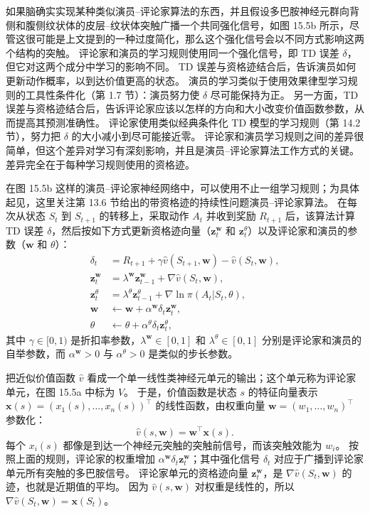 \documentclass[UTF8, 12pt, fontset=fandol, oneside]{ctexart}
\begin{document}
如果脑确实实现某种类似演员--评论家算法的东西，并且假设多巴胺神经元群向背侧和腹侧纹状体的皮层--纹状体突触广播一个共同强化信号，如图 15.5b 所示，尽管这很可能是上文提到的一种过度简化，那么这个强化信号会以不同方式影响这两个结构的突触。
评论家和演员的学习规则使用同一个强化信号，即 TD 误差 $\delta$，但它对这两个成分中学习的影响不同。
TD 误差与资格迹结合后，告诉演员如何更新动作概率，以到达价值更高的状态。
演员的学习类似于使用效果律型学习规则的工具性条件化（第 1.7 节）：演员努力使 $\delta$ 尽可能保持为正。
另一方面，TD 误差与资格迹结合后，告诉评论家应该以怎样的方向和大小改变价值函数参数，从而提高其预测准确性。
评论家使用类似经典条件化 TD 模型的学习规则（第 14.2 节），努力把 $\delta$ 的大小减小到尽可能接近零。
评论家和演员学习规则之间的差异很简单，但这个差异对学习有深刻影响，并且是演员--评论家算法工作方式的关键。
差异完全在于每种学习规则使用的资格迹。

在图 15.5b 这样的演员--评论家神经网络中，可以使用不止一组学习规则；为具体起见，这里关注第 13.6 节给出的带资格迹的持续性问题演员--评论家算法。
在每次从状态 $S_t$ 到 $S_{t+1}$ 的转移上，采取动作 $A_t$ 并收到奖励 $R_{t+1}$ 后，该算法计算 TD 误差 $\delta$，然后按如下方式更新资格迹向量（$\mathbf{z}_t^{\mathbf{w}}$ 和 $\mathbf{z}_t^\theta$）以及评论家和演员的参数（$\mathbf{w}$ 和 $\theta$）：
\[
\begin{aligned}
\delta_t &= R_{t+1}+\gamma \hat v(S_{t+1},\mathbf{w})-\hat v(S_t,\mathbf{w}),\\
\mathbf{z}_t^{\mathbf{w}} &= \lambda^{\mathbf{w}}\mathbf{z}_{t-1}^{\mathbf{w}}+\nabla \hat v(S_t,\mathbf{w}),\\
\mathbf{z}_t^\theta &= \lambda^\theta \mathbf{z}_{t-1}^\theta+\nabla \ln \pi(A_t|S_t,\theta),\\
\mathbf{w} &\leftarrow \mathbf{w}+\alpha^{\mathbf{w}}\delta_t\mathbf{z}_t^{\mathbf{w}},\\
\theta &\leftarrow \theta+\alpha^\theta\delta_t\mathbf{z}_t^\theta,
\end{aligned}
\]
其中 $\gamma\in[0,1)$ 是折扣率参数，$\lambda^{\mathbf{w}}\in[0,1]$ 和 $\lambda^\theta\in[0,1]$ 分别是评论家和演员的自举参数，而 $\alpha^{\mathbf{w}}>0$ 与 $\alpha^\theta>0$ 是类似的步长参数。

把近似价值函数 $\hat v$ 看成一个单一线性类神经元单元的输出；这个单元称为评论家单元，在图 15.5a 中标为 $V$。
于是，价值函数是状态 $s$ 的特征向量表示 $\mathbf{x}(s)=(x_1(s),\ldots,x_n(s))^\top$ 的线性函数，由权重向量 $\mathbf{w}=(w_1,\ldots,w_n)^\top$ 参数化：
\begin{equation}
\hat v(s,\mathbf{w})=\mathbf{w}^\top\mathbf{x}(s).
\tag{15.1}
\end{equation}
每个 $x_i(s)$ 都像是到达一个神经元突触的突触前信号，而该突触效能为 $w_i$。
按照上面的规则，评论家的权重增加 $\alpha^{\mathbf{w}}\delta_t\mathbf{z}_t^{\mathbf{w}}$；其中强化信号 $\delta_t$ 对应于广播到评论家单元所有突触的多巴胺信号。
评论家单元的资格迹向量 $\mathbf{z}_t^{\mathbf{w}}$，是 $\nabla\hat v(S_t,\mathbf{w})$ 的迹，也就是近期值的平均。
因为 $\hat v(s,\mathbf{w})$ 对权重是线性的，所以 $\nabla\hat v(S_t,\mathbf{w})=\mathbf{x}(S_t)$。
\end{document}
